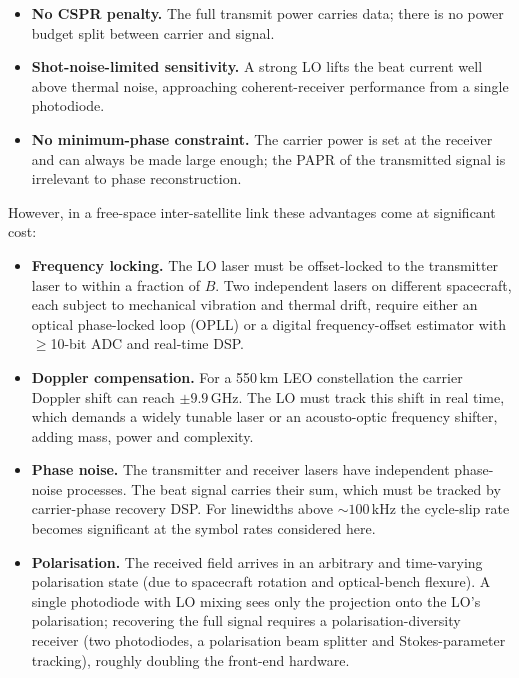 \begin{itemize}
\item \textbf{No CSPR penalty.} The full transmit power carries data; there is no power budget split between carrier and signal.
\item \textbf{Shot-noise-limited sensitivity.} A strong LO lifts the beat current well above thermal noise, approaching coherent-receiver performance from a single photodiode.
\item \textbf{No minimum-phase constraint.} The carrier power is set at the receiver and can always be made large enough; the PAPR of the transmitted signal is irrelevant to phase reconstruction.
\end{itemize}

However, in a free-space inter-satellite link these advantages come at significant cost:

\begin{itemize}
\item \textbf{Frequency locking.} The LO laser must be offset-locked to the transmitter laser to within a fraction of $B$. Two independent lasers on different spacecraft, each subject to mechanical vibration and thermal drift, require either an optical phase-locked loop (OPLL) or a digital frequency-offset estimator with $\ge$10-bit ADC and real-time DSP.

\item \textbf{Doppler compensation.} For a 550\,km LEO constellation the carrier Doppler shift can reach $\pm9.9$\,GHz. The LO must track this shift in real time, which demands a widely tunable laser or an acousto-optic frequency shifter, adding mass, power and complexity.

\item \textbf{Phase noise.} The transmitter and receiver lasers have independent phase-noise processes. The beat signal carries their sum, which must be tracked by carrier-phase recovery DSP. For linewidths above $\sim100$\,kHz the cycle-slip rate becomes significant at the symbol rates considered here.

\item \textbf{Polarisation.} The received field arrives in an arbitrary and time-varying polarisation state (due to spacecraft rotation and optical-bench flexure). A single photodiode with LO mixing sees only the projection onto the LO's polarisation; recovering the full signal requires a polarisation-diversity receiver (two photodiodes, a polarisation beam splitter and Stokes-parameter tracking), roughly doubling the front-end hardware.
\end{itemize}

